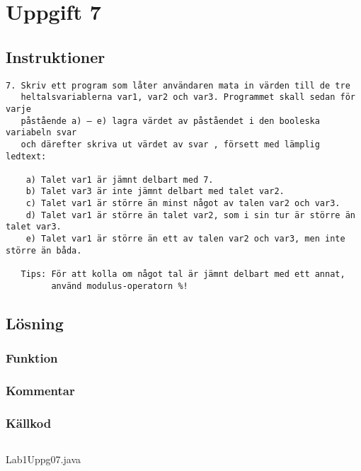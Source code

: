 \section{Uppgift 7}\label{uppgift-7}

\subsection{Instruktioner}
\begin{verbatim}
7. Skriv ett program som låter användaren mata in värden till de tre
   heltalsvariablerna var1, var2 och var3. Programmet skall sedan för varje
   påstående a) – e) lagra värdet av påståendet i den booleska variabeln svar
   och därefter skriva ut värdet av svar , försett med lämplig ledtext:

    a) Talet var1 är jämnt delbart med 7.
    b) Talet var3 är inte jämnt delbart med talet var2.
    c) Talet var1 är större än minst något av talen var2 och var3.
    d) Talet var1 är större än talet var2, som i sin tur är större än talet var3.
    e) Talet var1 är större än ett av talen var2 och var3, men inte större än båda.

   Tips: För att kolla om något tal är jämnt delbart med ett annat,
         använd modulus-operatorn %!
\end{verbatim}


\subsection{Lösning}
\subsubsection{Funktion}
\subsubsection{Kommentar}

\subsubsection{Källkod}\label{uppgift-7_src}
    \inputminted[linenos]{java}{src/Lab1Uppg07.java}
    \caption{Lab1Uppg07.java}
    \label{Uppg7src}

